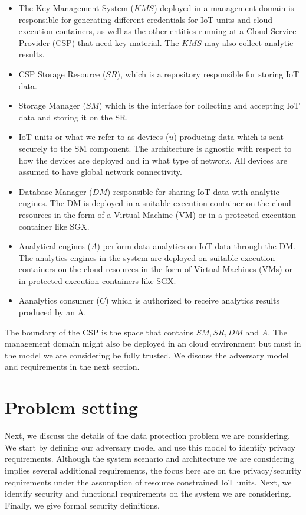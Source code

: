 {%
\begin{itemize}
\item The Key Management System ($KMS$) deployed in a management domain is responsible for generating different credentials for IoT units and cloud execution containers, as well as the other entities running at a Cloud Service Provider (CSP) that need key material. The $KMS$ may also collect analytic results. 
\item CSP Storage Resource ($SR$), which is a repository responsible
for storing IoT data. 
\item Storage Manager ($SM$) which is the interface for collecting and accepting IoT data and storing it on the SR.
\item IoT units or what we refer to as devices ($u$) producing data which is sent securely to the SM component. The architecture is agnostic with respect to how the devices are deployed and in what type of network. All devices are assumed to have global network connectivity.
\item Database Manager ($DM$) responsible for sharing IoT data with analytic engines. The DM is deployed in a suitable execution container on the cloud resources in the form of a Virtual Machine (VM) or in a protected execution container like SGX.
\item Analytical engines ($A$) perform data analytics on IoT data through the DM. The analytics engines in the system are deployed on suitable execution containers on the cloud resources in the form of  Virtual Machines (VMs) or in protected execution containers like SGX.
\item Aanalytics consumer ($C$) which is authorized to receive analytics results produced by an A.
\end{itemize}

The boundary of the CSP is the space that contains $SM, SR, DM$ and $A$. The management domain might also be deployed in an cloud environment but must in the model we are considering be fully trusted. We discuss the adversary model and requirements in the next section. 

\section{Problem setting}
\label{requirements}
Next, we discuss the details of the data protection problem we are considering. We start by defining our adversary model and use this model to identify privacy requirements. Although the system scenario and architecture we are considering implies several additional requirements, the focus here are on the privacy/security requirements under the assumption of resource constrained IoT units. Next, we identify security and functional requirements on the system we are considering. Finally, we give formal security definitions. 
}
